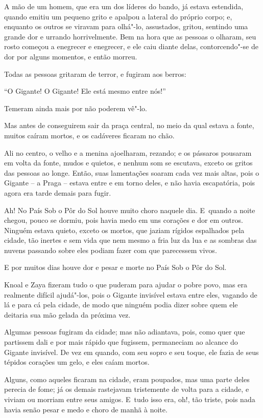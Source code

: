 A mão de um homem, que era um dos líderes do bando, já estava estendida,
quando emitiu um pequeno grito e apalpou a lateral do
próprio corpo; e, enquanto os outros se viravam para olhá"-lo,
assustados, gritou, sentindo uma grande dor e urrando horrivelmente.
Bem na hora que as pessoas o olharam, seu rosto começou a enegrecer e
enegrecer, e ele caiu diante delas, contorcendo"-se de dor por alguns momentos, e
então morreu.

Todas as pessoas gritaram de terror, e fugiram aos berros:

``O Gigante! O Gigante! Ele está mesmo entre nós!''

Temeram ainda mais por não poderem vê"-lo.

Mas antes de conseguirem sair da praça central, no meio da qual
estava a fonte, muitos caíram mortos, e os cadáveres ficaram no chão.

Ali no centro, o velho e a menina ajoelharam, rezando; e os pássaros
pousaram em volta da fonte, mudos e quietos, e nenhum som se escutava,
exceto os gritos das pessoas ao longe. Então, suas lamentações soaram
cada vez mais altas, pois o Gigante -- a Praga -- estava entre e em
torno deles, e não havia escapatória, pois agora era tarde demais para
fugir.

Ah! No País Sob o Pôr do Sol houve muito choro naquele dia. E~quando a
noite chegou, pouco se dormiu, pois havia medo em uns corações e dor
em outros. Ninguém estava quieto, exceto os mortos, que jaziam rígidos
espalhados pela cidade, tão inertes e sem vida que nem mesmo a fria luz da lua e as
sombras das nuvens passando sobre eles podiam fazer com que parecessem
vivos.

E por muitos dias houve dor e pesar e morte no País Sob o Pôr do Sol.

Knoal e Zaya fizeram tudo o que puderam para ajudar o pobre povo, mas
era realmente difícil ajudá"-los, pois o Gigante invisível estava entre
eles, vagando de lá e para cá pela cidade, de modo que ninguém podia
dizer sobre quem ele deitaria sua mão gelada da próxima vez.

Algumas pessoas fugiram da cidade; mas não adiantava, pois, como quer
que partissem dali e por mais rápido que fugissem, permaneciam ao
alcance do Gigante invisível. De vez em quando, com seu sopro e seu
toque, ele fazia de seus tépidos corações um gelo, e eles caíam mortos.

Alguns, como aqueles ficaram na cidade, eram poupados, mas uma parte
deles perecia de fome; já os demais rastejavam tristemente de volta para
a cidade, e viviam ou morriam entre seus amigos. E~tudo isso era, oh!,
tão triste, pois nada havia senão pesar e medo e choro de manhã à noite.

